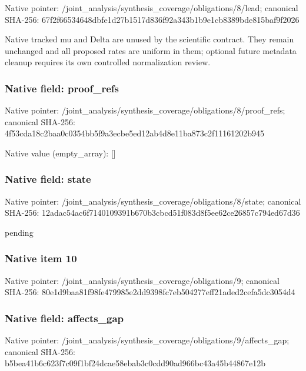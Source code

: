 \documentclass[10pt,a4paper]{article}
\begin{document}
Native pointer: /joint\_analysis/synthesi\allowbreak{}s\_coverage/obligations/8\allowbreak{}/lead; canonical SHA-256: 67f2f66534648dbfe1d27b15\allowbreak{}17d836f92a343b1b9e1cb838\allowbreak{}9bde815baf9f2026


Native tracked mu and Delta are unused by the scientific contract. They remain unchanged and all proposed rates are uniform in them; optional future metadata cleanup requires its own controlled normalization review.


\subsubsection{Native field: proof\_refs}


Native pointer: /joint\_analysis/synthesi\allowbreak{}s\_coverage/obligations/8\allowbreak{}/proof\_refs; canonical SHA-256: 4f53cda18c2baa0c0354bb5f\allowbreak{}9a3ecbe5ed12ab4d8e11ba87\allowbreak{}3c2f11161202b945



Native value (empty\_array): []



\subsubsection{Native field: state}


Native pointer: /joint\_analysis/synthesi\allowbreak{}s\_coverage/obligations/8\allowbreak{}/state; canonical SHA-256: 12adac54ac6f7140109391b6\allowbreak{}70b3cbcd51f083d8f5ee62ce\allowbreak{}26857c794ed67d36


pending


\subsubsection{Native item 10}


Native pointer: /joint\_analysis/synthesi\allowbreak{}s\_coverage/obligations/9; canonical SHA-256: 80e1d9baa81f98fe479985e2\allowbreak{}dd9398fc7eb504277eff21ad\allowbreak{}ed2cefa5dc3054d4



\subsubsection{Native field: affects\_gap}


Native pointer: /joint\_analysis/synthesi\allowbreak{}s\_coverage/obligations/9\allowbreak{}/affects\_gap; canonical SHA-256: b5bea41b6c623f7c09f1bf24\allowbreak{}dcae58ebab3c0cdd90ad966b\allowbreak{}c43a45b44867e12b
\end{document}
